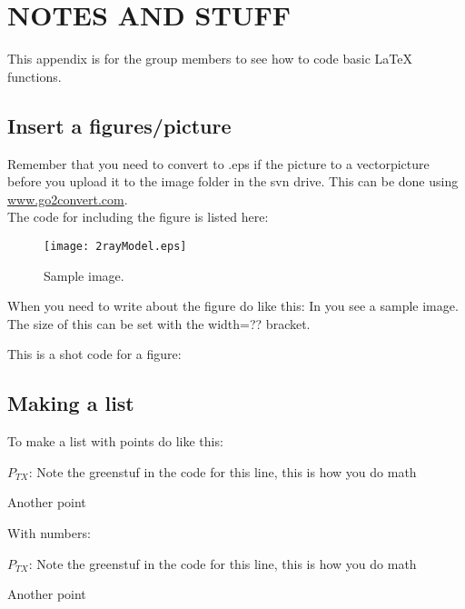 \chapter{NOTES AND STUFF}

This appendix is for the group members to see how to code basic \LaTeX{} functions.
\section{Insert a figures/picture}
Remember that you need to convert to .eps if the picture to a vectorpicture before you upload it to the image folder in the svn drive. This can be done using \url{www.go2convert.com}.\\ %

The code for including the figure is listed here:

\begin{figure}[!h]
  \centering
  \texttt{[image: 2rayModel.eps]}
  \caption{Sample image.}
  \label{fig:REMEMBER_TO_CHANGE_THE_LABEL}
\end{figure}

When you need to write about the figure do like this: In  you see a sample image. The size of this can be set with the width=?? bracket.

This is a shot code for a figure:

\section{Making a list}

To make a list with points do like this:
\begin{pitemize}
\item $P_{TX}$: Note the greenstuf in the code for this line, this is how you do math
\item Another point
\end{pitemize}

With numbers:
\begin{penumrate}
\item $P_{TX}$: Note the greenstuf in the code for this line, this is how you do math
\item Another point
\end{penumrate}

